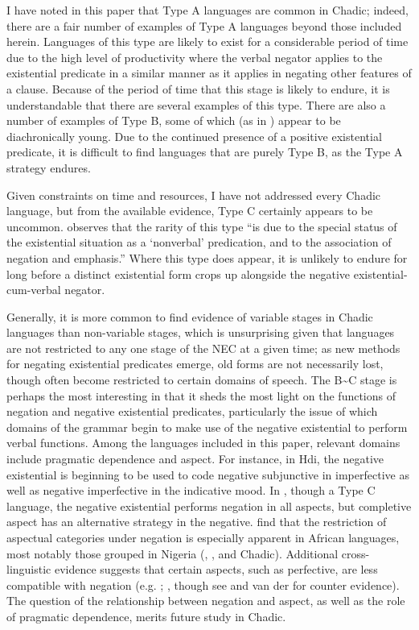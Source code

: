 \documentclass[output=paper]{langsci/langscibook}
\begin{document}
I have noted in this paper that Type A languages are common in Chadic;
indeed, there are a fair number of examples of Type A languages beyond those included
herein. Languages of this type are likely to exist for a considerable
period of time due to the high level of productivity where the verbal
negator applies to the existential predicate in a similar manner as it
applies in negating other features of a clause. Because of the period of time
that this stage is likely to endure, it is understandable that there are
several examples of this type. There are also a number of examples of Type
B, some of which (as in ) appear to be diachronically young.  Due
to the continued presence of a positive existential predicate, it is
difficult to find languages that are purely Type B, as the Type A strategy
endures.

Given constraints on time and resources, I have not addressed every Chadic language, but from the available evidence, Type C certainly appears to be uncommon. \citet[18]{Croft1991} observes that the rarity of this type ``is due to the special status of the existential situation as a `nonverbal' predication, and to the association of negation and emphasis.''  Where this type does appear, it is unlikely to endure for long before a distinct existential form crops up alongside the negative existential-cum-verbal negator.

Generally, it is more common to find evidence of variable stages in Chadic
languages than non-variable stages, which is unsurprising given that
languages are not restricted to any one stage of the NEC at a given time;
as new methods for negating existential predicates emerge, old forms are
not necessarily lost, though often become restricted to certain domains of
speech. The B{\textasciitilde}C stage is perhaps the most interesting in
that it sheds the most light on the functions of negation and negative
existential predicates, particularly the issue of which domains of the
grammar begin to make use of the negative existential to perform verbal
functions. Among the languages included in this paper, relevant domains
include pragmatic dependence and aspect. For instance, in Hdi, the negative
existential is beginning to be used to code negative subjunctive in
imperfective as well as negative imperfective in the indicative mood. In
, though a Type C language, the negative existential performs
negation in all aspects, but completive aspect has an alternative strategy
in the negative. \citet{MiestamoAuwera2011} find that the restriction of
aspectual categories under negation is especially apparent in African
languages, most notably those grouped in Nigeria (,
, and Chadic). Additional cross-linguistic
evidence suggests that certain aspects, such as perfective, are less compatible with
negation (e.g. \citealt{Schmid1980}; \citealt{Matthews1990}, though see and
van der \citealt{MiestamoAuwera2011} for counter evidence). The question of
the relationship between negation and aspect, as well as the role of
pragmatic dependence, merits future study in Chadic.
\end{document}

